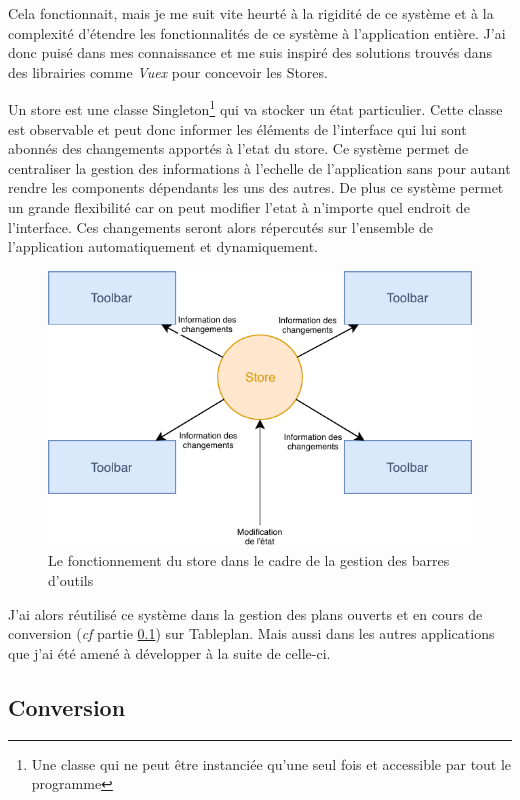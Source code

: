 Cela fonctionnait, mais je me suit vite heurté à la rigidité de ce système et à la complexité d'étendre les fonctionnalités de ce système à l'application entière.
J'ai donc puisé dans mes connaissance et me suis inspiré des solutions trouvés dans des librairies comme \emph{Vuex} pour concevoir les Stores.

Un store est une classe Singleton\footnote{Une classe qui ne peut être instanciée qu'une seul fois et accessible par tout le programme}  qui va stocker un état particulier.
Cette classe est observable et peut donc informer les éléments de l'interface qui lui sont abonnés des changements apportés à l'etat du store.
Ce système permet de centraliser la gestion des informations à l'echelle de l'application sans pour autant rendre les components dépendants les uns des autres.
De plus ce système permet un grande flexibilité car on peut modifier l'etat à n'importe quel endroit de l'interface.
Ces changements seront alors répercutés sur l'ensemble de l'application automatiquement et dynamiquement.

\begin{figure}[h]
    \centering
    \includegraphics[scale=1.5]{img/store.pdf}
    \caption{Le fonctionnement du store dans le cadre de la gestion des barres d'outils}
\end{figure}

J'ai alors réutilisé ce système dans la gestion des plans ouverts et en cours de conversion (\emph{cf} partie \ref{eiffageTablePlanConversion}) sur Tableplan.
Mais aussi dans les autres applications que j'ai été amené à développer à la suite de celle-ci.

\clearpage

\subsection{Conversion}
\label{eiffageTablePlanConversion}

